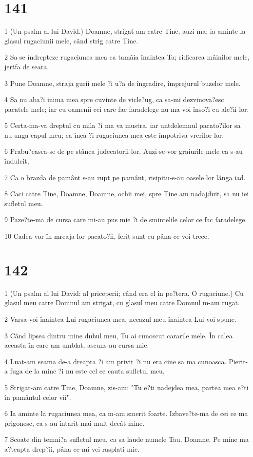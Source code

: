 \chapter{141}

\par 1 (Un psalm al lui David.) Doamne, strigat-am catre Tine, auzi-ma; ia aminte la glasul rugaciunii mele, când strig catre Tine.
\par 2 Sa se îndrepteze rugaciunea mea ca tamâia înaintea Ta; ridicarea mâinilor mele, jertfa de seara.
\par 3 Pune Doamne, straja gurii mele ?i u?a de îngradire, împrejurul buzelor mele.
\par 4 Sa nu aba?i inima mea spre cuvinte de vicle?ug, ca sa-mi dezvinova?esc pacatele mele; iar cu oamenii cei care fac faradelege nu ma voi înso?i cu ale?ii lor.
\par 5 Certa-ma-va dreptul cu mila ?i ma va mustra, iar untdelemnul pacato?ilor sa nu unga capul meu; ca înca ?i rugaciunea mea este împotriva vrerilor lor.
\par 6 Prabu?easca-se de pe stânca judecatorii lor. Auzi-se-vor graiurile mele ca s-au îndulcit,
\par 7 Ca o brazda de pamânt s-au rupt pe pamânt, risipitu-s-au oasele lor lânga iad.
\par 8 Caci catre Tine, Doamne, Doamne, ochii mei, spre Tine am nadajduit, sa nu iei sufletul meu.
\par 9 Paze?te-ma de cursa care mi-au pus mie ?i de smintelile celor ce fac faradelege.
\par 10 Cadea-vor în mreaja lor pacato?ii, ferit sunt eu pâna ce voi trece.

\chapter{142}

\par 1 (Un psalm al lui David: al priceperii; când era el în pe?tera. O rugaciune.) Cu glasul meu catre Domnul am strigat, cu glasul meu catre Domnul m-am rugat.
\par 2 Varsa-voi înaintea Lui rugaciunea mea, necazul meu înaintea Lui voi spune.
\par 3 Când lipsea dintru mine duhul meu, Tu ai cunoscut cararile mele. În calea aceasta în care am umblat, ascuns-au cursa mie.
\par 4 Luat-am seama de-a dreapta ?i am privit ?i nu era cine sa ma cunoasca. Pierit-a fuga de la mine ?i nu este cel ce cauta sufletul meu.
\par 5 Strigat-am catre Tine, Doamne, zis-am: "Tu e?ti nadejdea mea, partea mea e?ti în pamântul celor vii".
\par 6 Ia aminte la rugaciunea mea, ca m-am smerit foarte. Izbave?te-ma de cei ce ma prigonesc, ca s-au întarit mai mult decât mine.
\par 7 Scoate din temni?a sufletul meu, ca sa laude numele Tau, Doamne. Pe mine ma a?teapta drep?ii, pâna ce-mi vei rasplati mie.


